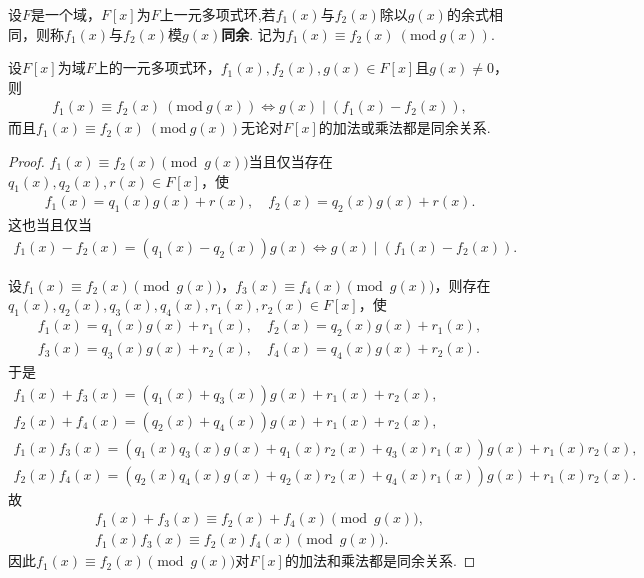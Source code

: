 \documentclass[../../main.tex]{subfiles}%
\begin{document}
\begin{definition}
设$F$是一个域，$F[x]$为$F$上一元多项式环,若$f_1(x)$与$f_2(x)$除以$g(x)$的余式相同，则称$f_1(x)$与$f_2(x)$模$g(x)$\textbf{同余}. 记为$f_1(x) \equiv f_2(x)\ (\mathrm{mod}\ g(x))$.
\end{definition}

\begin{corollary}\label{corollary:抽象代数--推论2.6.1}
设$F[x]$为域$F$上的一元多项式环，$f_1(x), f_2(x), g(x) \in F[x]$且$g(x) \neq 0$，则
\begin{align*}
f_1(x) \equiv f_2(x)\ (\mathrm{mod}\ g(x))\iff g(x) \mid (f_1(x) - f_2(x)),
\end{align*}
而且$f_1(x) \equiv f_2(x)\ (\mathrm{mod}\ g(x))$无论对$F[x]$的加法或乘法都是同余关系.
\end{corollary}
\begin{proof}

$f_1(x) \equiv f_2(x) \pmod{g(x)}$当且仅当存在$q_1(x), q_2(x), r(x) \in F[x]$，使
\begin{align*}
f_1(x) = q_1(x)g(x) + r(x),\quad f_2(x) = q_2(x)g(x) + r(x).
\end{align*}
这也当且仅当
\begin{align*}
f_1(x) - f_2(x) = (q_1(x) - q_2(x))g(x) \iff g(x) \mid (f_1(x) - f_2(x)).
\end{align*}

设$f_1(x) \equiv f_2(x) \pmod{g(x)}$，$f_3(x) \equiv f_4(x) \pmod{g(x)}$，则存在$q_1(x), q_2(x), q_3(x), q_4(x), r_1(x), r_2(x) \in F[x]$，使
\begin{align*}
f_1(x) = q_1(x)g(x) + r_1(x),\quad f_2(x) = q_2(x)g(x) + r_1(x),\\
f_3(x) = q_3(x)g(x) + r_2(x),\quad f_4(x) = q_4(x)g(x) + r_2(x).
\end{align*}
于是
\begin{gather*}
f_1(x) + f_3(x) = (q_1(x) + q_3(x))g(x) + r_1(x) + r_2(x),\\
f_2(x) + f_4(x) = (q_2(x) + q_4(x))g(x) + r_1(x) + r_2(x),\\
f_1(x)f_3(x) = (q_1(x)q_3(x)g(x) + q_1(x)r_2(x) + q_3(x)r_1(x))g(x) + r_1(x)r_2(x),\\
f_2(x)f_4(x) = (q_2(x)q_4(x)g(x) + q_2(x)r_2(x) + q_4(x)r_1(x))g(x) + r_1(x)r_2(x).
\end{gather*}
故
\begin{align*}
f_1(x) + f_3(x) \equiv f_2(x) + f_4(x) \pmod{g(x)},\\
f_1(x)f_3(x) \equiv f_2(x)f_4(x) \pmod{g(x)}.
\end{align*}
因此$f_1(x) \equiv f_2(x) \pmod{g(x)}$对$F[x]$的加法和乘法都是同余关系.

\end{proof}
\end{document}
